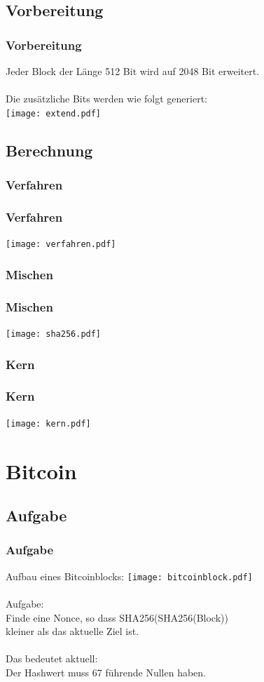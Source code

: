 \documentclass{beamer}
\begin{document}
\subsection{Vorbereitung}
  \begin{frame}
    \frametitle{Vorbereitung}
    Jeder Block der Länge 512 Bit wird auf 2048 Bit erweitert.\\
    ~\\
    Die zusätzliche Bits werden wie folgt generiert:\\
    \texttt{[image: extend.pdf]}
  \end{frame}
\subsection{Berechnung}
\subsubsection{Verfahren}
  \begin{frame}
    \frametitle{Verfahren}
    \texttt{[image: verfahren.pdf]}
  \end{frame}
\subsubsection{Mischen}
  \begin{frame}
    \frametitle{Mischen}
    \texttt{[image: sha256.pdf]}
  \end{frame}
\subsubsection{Kern}
  \begin{frame}
    \frametitle{Kern}
    \texttt{[image: kern.pdf]}
  \end{frame}
\section{Bitcoin}
\subsection{Aufgabe}
  \begin{frame}
    \frametitle{Aufgabe}
    Aufbau eines Bitcoinblocks:
    \texttt{[image: bitcoinblock.pdf]}\\
    ~\\
    Aufgabe:\\
    Finde eine Nonce, so dass SHA256(SHA256(Block))\\
    kleiner als das aktuelle Ziel ist.\\
    ~\\
    Das bedeutet aktuell:\\
    Der Hashwert muss 67 führende Nullen haben.
  \end{frame}
\end{document}
